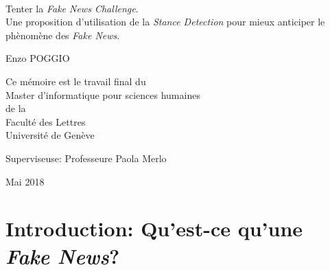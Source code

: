 \documentclass[11pt,a4paper,oldfontcommands]{memoir}
\begin{document}
%
%
\thispagestyle{empty}

{%
\sffamily
\centering
\Large

~\vspace{\fill}

{\huge
Tenter la \textit{Fake News Challenge}.\\
{\LARGE
Une proposition d'utilisation de la \textit{Stance Detection} pour mieux anticiper le phènomène des \textit{Fake News}.
}
}

\vspace{2.5cm}

{\LARGE
 Enzo POGGIO
}

\vspace{3.5cm}

Ce mémoire est le travail final du\\
Master d'informatique pour sciences humaines\\[1em]
de la\\[1em]
Faculté des Lettres\\
Université de Genève

\vspace{3.5cm}

Superviseuse: Professeure Paola Merlo

\vspace{\fill}

Mai 2018

}%

\cleardoublepage

\tableofcontents*


\clearpage

\chapter{Introduction: Qu'est-ce qu'une \textit{Fake News}?}
\end{document}
